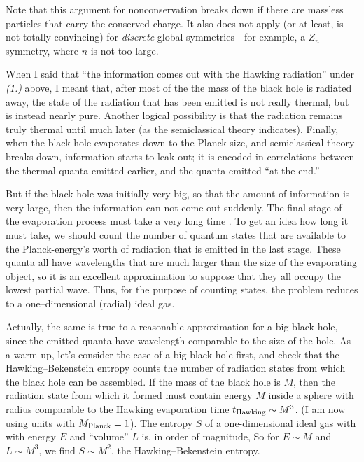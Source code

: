Note that this argument for nonconservation breaks down if there are massless
particles that
carry the conserved charge. It also
does not apply (or at least, is not totally convincing) for
{\it discrete} global symmetries---for example, a $Z_n$
symmetry, where $n$ is not too large.

\bigskip
{}
When I said that ``the information comes out with the Hawking radiation'' under
{\it (1.)} above, I meant that, after most of the the mass of the black hole is
radiated away, the state of the radiation that has been emitted is not really
thermal, but is instead nearly pure.  Another logical possibility is that the
radiation remains truly thermal until much later (as the semiclassical theory
indicates).  Finally, when the black hole  evaporates down to the Planck size,
and semiclassical theory breaks down, information starts to leak out;
it is encoded in correlations between the thermal  quanta emitted earlier, and
the quanta emitted ``at the end.''

But if the black hole was initially very big, so that the amount of information
is very large, then the information can not come out suddenly.  The final stage
of the
evaporation process must take a very long time\lref{}\lref{}
.
To get an idea how long it must take, we should count the number of
quantum states that are available to the Planck-energy's worth of radiation
that is emitted in the last stage.  These quanta all have wavelengths
that are much larger than the size of the evaporating object, so it is an
excellent approximation to suppose that they
all occupy the lowest partial wave.  Thus, for the purpose of counting
states, the problem reduces to a one--dimensional (radial) ideal gas.

Actually, the same is true to a
reasonable approximation for a big black hole, since the emitted quanta
have wavelength comparable to the size of the hole.  As a warm up, let's
consider the case of a big black hole first, and check that the
Hawking--Bekenstein entropy counts the number of radiation states from
which the black hole can be assembled.  If the mass of the black hole is
$M$, then the radiation state from which it formed must contain energy
$M$ inside a sphere with radius
comparable to the Hawking evaporation time
$t_{\rm Hawking}\sim M^3$.  (I am now using units with $M_{\rm Planck}=1$).
The
entropy $S$ of a one-dimensional ideal gas  with with energy $E$ and
``volume'' $L$ is, in order of magnitude,
\eqn{}
%
So for $E\sim M$ and $L\sim M^3$, we find $S\sim M^2$, the Hawking--Bekenstein
entropy.

